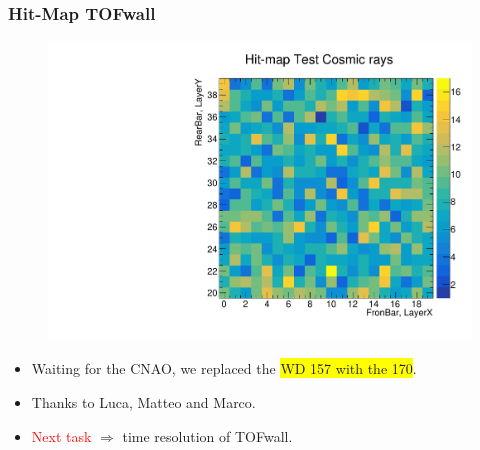 \begin{frame} [fragile]
    \small
        \frametitle{Hit-Map TOFwall}
                \begin{figure}
                 \centering
                    \includegraphics[scale=0.28]{figures/hit_map_10nov.pdf}
                \end{figure}
            
            
				\begin{itemize}
                    \item Waiting for the CNAO, we replaced the \colorbox{yellow}{WD 157 with the 170}.
                    \item Thanks to Luca, Matteo and Marco.
                    \item \textcolor{red}{Next task} $\Longrightarrow$ time resolution of TOFwall.
                \end{itemize}    
    \end{frame}
